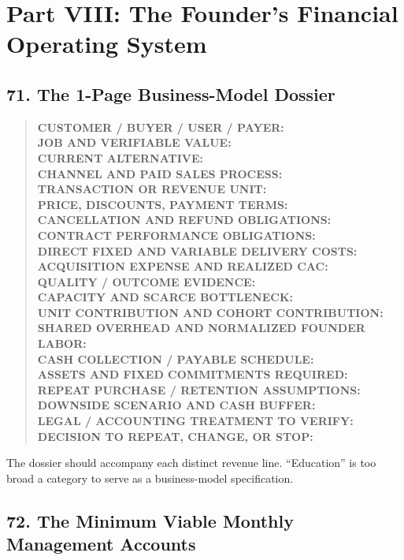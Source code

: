 \section*{Part VIII: The Founder's Financial Operating System}

\subsection*{71. The 1-Page Business-Model Dossier}

\begin{quote}
\small
\textbf{CUSTOMER / BUYER / USER / PAYER:}\\
\textbf{JOB AND VERIFIABLE VALUE:}\\
\textbf{CURRENT ALTERNATIVE:}\\
\textbf{CHANNEL AND PAID SALES PROCESS:}\\
\textbf{TRANSACTION OR REVENUE UNIT:}\\
\textbf{PRICE, DISCOUNTS, PAYMENT TERMS:}\\
\textbf{CANCELLATION AND REFUND OBLIGATIONS:}\\
\textbf{CONTRACT PERFORMANCE OBLIGATIONS:}\\
\textbf{DIRECT FIXED AND VARIABLE DELIVERY COSTS:}\\
\textbf{ACQUISITION EXPENSE AND REALIZED CAC:}\\
\textbf{QUALITY / OUTCOME EVIDENCE:}\\
\textbf{CAPACITY AND SCARCE BOTTLENECK:}\\
\textbf{UNIT CONTRIBUTION AND COHORT CONTRIBUTION:}\\
\textbf{SHARED OVERHEAD AND NORMALIZED FOUNDER LABOR:}\\
\textbf{CASH COLLECTION / PAYABLE SCHEDULE:}\\
\textbf{ASSETS AND FIXED COMMITMENTS REQUIRED:}\\
\textbf{REPEAT PURCHASE / RETENTION ASSUMPTIONS:}\\
\textbf{DOWNSIDE SCENARIO AND CASH BUFFER:}\\
\textbf{LEGAL / ACCOUNTING TREATMENT TO VERIFY:}\\
\textbf{DECISION TO REPEAT, CHANGE, OR STOP:}
\end{quote}

The dossier should accompany each distinct revenue line. ``Education'' is too broad a category to serve as a business-model specification.

\subsection*{72. The Minimum Viable Monthly Management Accounts}

